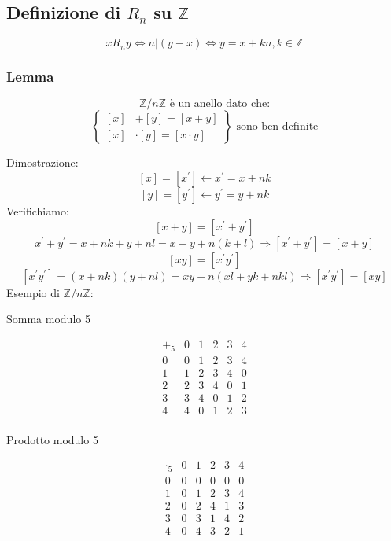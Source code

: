 \documentclass[a4paper,12pt]{article}
\newcommand{\rel}[1][R]{R}
\begin{document}
	\subsection{Definizione di $\rel_n$ su $\mathbb{Z}$}
	\[x \rel_n y \iff n | (y - x) \iff y = x + kn, k\in \mathbb{Z}\]
	
	\subsubsection{Lemma}
	\[\mathbb{Z}/n\mathbb{Z} \text{ è un anello dato che:}\]
	\[\left\{\begin{aligned}
		[x] &+ [y] = [x + y] \\
		[x] &\cdot [y] = [x \cdot y]
	\end{aligned}\right\} \text{ sono ben definite}\]
	
	Dimostrazione:
	\[[x] = [x^\prime] \leftarrow x^\prime = x + nk\]
	\[[y] = [y^\prime] \leftarrow y^\prime = y + nk\]
	Verifichiamo:
	\[[x + y] = [x^\prime + y^\prime]\]
	\[x^\prime + y^\prime = x +nk + y + nl = x + y +n(k + l) \Rightarrow [x^\prime + y^\prime] = [x + y]\]
	\[[xy] = [x^\prime y^\prime]\]
	\[[x^\prime y^\prime] = (x +nk)(y + nl) = xy + n(xl + yk + nkl) \Rightarrow [x^\prime y^\prime] = [xy]\]
	Esempio di $\mathbb{Z}/n\mathbb{Z}$:
	
	\begin{table}[h!]
		\centering
		\begin{minipage}{0.45\textwidth}
			\centering
			\caption*{Somma modulo 5}
			\[
			\begin{array}{c|ccccc}
				+_5 & 0 & 1 & 2 & 3 & 4 \\
				\hline
				0 & 0 & 1 & 2 & 3 & 4 \\
				1 & 1 & 2 & 3 & 4 & 0 \\
				2 & 2 & 3 & 4 & 0 & 1 \\
				3 & 3 & 4 & 0 & 1 & 2 \\
				4 & 4 & 0 & 1 & 2 & 3 \\
			\end{array}
			\]
		\end{minipage}
		\hfill
		\begin{minipage}{0.45\textwidth}
			\centering
			\caption*{Prodotto modulo 5}
			\[
			\begin{array}{c|ccccc}
				\cdot_5 & 0 & 1 & 2 & 3 & 4 \\
				\hline
				0 & 0 & 0 & 0 & 0 & 0 \\
				1 & 0 & 1 & 2 & 3 & 4 \\
				2 & 0 & 2 & 4 & 1 & 3 \\
				3 & 0 & 3 & 1 & 4 & 2 \\
				4 & 0 & 4 & 3 & 2 & 1 \\
			\end{array}
			\]
		\end{minipage}
	\end{table}
	
\end{document}
